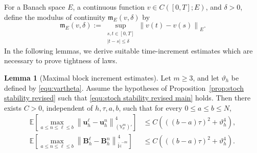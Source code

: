 \documentclass[11pt, reqno]{amsart}
\theoremstyle{definition}
\newtheorem{lemma}[theorem]{Lemma}
\numberwithin{equation}{section}
\newcommand{\bff}{\boldsymbol}
\newcommand{\bb}{\mathbb}
\newcommand{\norm}[2]{\left\|{#1}\right\|_{#2}}
\begin{document}
For a Banach space $E$, a continuous function $v\in C([0,T];E)$, and
$\delta>0$, define the modulus of continuity $\mathfrak m_E(v,\delta)$ by
\[ 
\mathfrak m_E(v,\delta)
:=
\sup_{\substack{s,t\in[0,T]\\ |t-s|\le\delta}}
\norm{v(t)-v(s)}{E}.
\]
In the following lemmas, we derive suitable time-increment estimates which are necessary to prove tightness of laws.


\begin{lemma}[Maximal block increment estimates]
	\label{lem:conv maximal block increments}
	Let $m\ge 3$, and let $\vartheta_h$ be defined by \eqref{equ:vartheta}.
	Assume the hypotheses of Proposition~\ref{prop:stoch stability revised} such that \eqref{equ:stoch stability revised main} holds. Then there exists $C>0$, independent of $h,\tau,a,b$, such that for every
	$0\le a\le b\le N$,
	\begin{align}
		\label{equ:maximal block u}
		\bb E
		\left[
		\max_{a\le n\le \ell\le b}
		\norm{\bff u_h^\ell-\bff u_h^n}{(\bb V^m_\sigma)'}^{4}
		\right]
		&\le
		C\left(((b-a)\tau)^2+\vartheta_h^4\right),
		\\
		\label{equ:maximal block B}
		\bb E
		\left[
		\max_{a\le n\le \ell\le b}
		\norm{\bff B_h^\ell-\bff B_h^n}{\widetilde{\bb H}^{-m}}^{4}
		\right]
		&\le
		C\left(((b-a)\tau)^2+\vartheta_h^4\right).
	\end{align}
\end{lemma}
\end{document}
